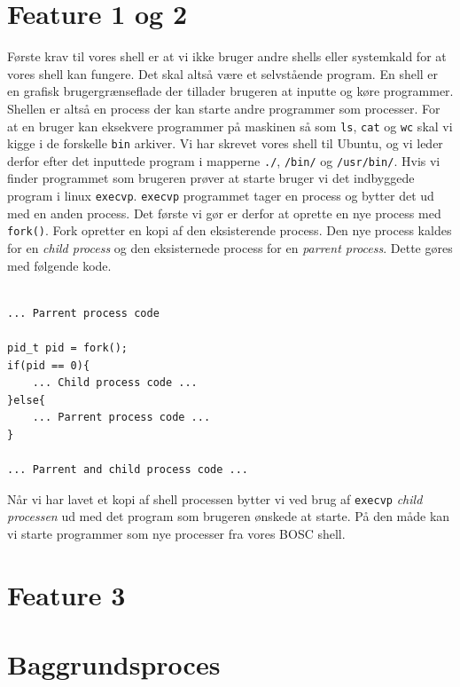 \documentclass[danish]{report}
\begin{document}
\section{Feature 1 og 2}
Første krav til vores shell er at vi ikke bruger andre shells eller systemkald for at vores shell kan fungere. Det skal altså være et selvstående program. En shell er en grafisk brugergrænseflade der tillader brugeren at inputte og køre programmer. Shellen er altså en process der kan starte andre programmer som processer. For at en bruger kan eksekvere programmer på maskinen så som {\tt ls}, {\tt cat} og {\tt wc} skal vi kigge i de forskelle {\tt bin} arkiver. Vi har skrevet vores shell til Ubuntu, og vi leder derfor efter det inputtede program i mapperne {\tt ./}, {\tt /bin/} og {\tt /usr/bin/}. Hvis vi finder programmet som brugeren prøver at starte bruger vi det indbyggede program i linux {\tt execvp}. {\tt execvp} programmet tager en process og bytter det ud med en anden process. Det første vi gør er derfor at oprette en nye process med {\tt fork()}. Fork opretter en kopi af den eksisterende process. Den nye process kaldes for en \textit{child process} og den eksisternede process for en \textit{parrent process}. Dette gøres med følgende kode.

\begin{lstlisting}

... Parrent process code

pid_t pid = fork();
if(pid == 0){
    ... Child process code ...
}else{
    ... Parrent process code ...
}

... Parrent and child process code ...

\end{lstlisting}

Når vi har lavet et kopi af shell processen bytter vi ved brug af {\tt execvp} \textit{child processen} ud med det program som brugeren ønskede at starte. På den måde kan vi starte programmer som nye processer fra vores BOSC shell.

\section{Feature 3}
\section{Baggrundsproces}
\end{document}
